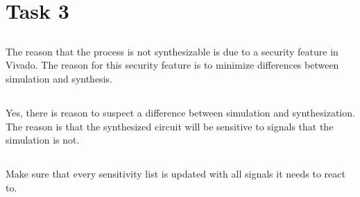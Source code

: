 \documentclass{article}
\begin{document}
\section{Task 3}
\subsection{}
The reason that the process is not synthesizable is due to a security
feature in Vivado. The reason for this security feature is to minimize
differences between simulation and synthesis.

\subsection{}
Yes, there is reason to suspect a difference between simulation and
synthesization. The reason is that the synthesized circuit will be
sensitive to signals that the simulation is not.

\subsection{}
Make sure that every sensitivity list is updated with all signals it
needs to react to.
\end{document}
